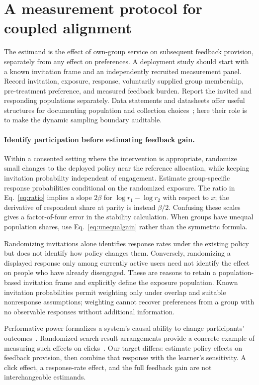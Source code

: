 \documentclass{article}
\begin{document}
\section{A measurement protocol for coupled alignment}\label{sec:measurement}
The estimand is the effect of own-group service on subsequent feedback provision, separately from any effect on preferences. A deployment study should start with a known invitation frame and an independently recruited measurement panel. Record invitation, exposure, response, voluntarily supplied group membership, pre-treatment preference, and measured feedback burden. Report the invited and responding populations separately. Data statements and datasheets offer useful structures for documenting population and collection choices~\citep{bender2018,gebru2021}; here their role is to make the dynamic sampling boundary auditable.

\paragraph{Identify participation before estimating feedback gain.}
Within a consented setting where the intervention is appropriate, randomize small changes to the deployed policy near the reference allocation, while keeping invitation probability independent of engagement. Estimate group-specific response probabilities conditional on the randomized exposure. The ratio in Eq.~\eqref{eq:ratio} implies a slope $2\beta$ for $\log r_1-\log r_2$ with respect to $x$; the derivative of respondent share at parity is instead $\beta/2$. Confusing these scales gives a factor-of-four error in the stability calculation. When groups have unequal population shares, use Eq.~\eqref{eq:unequalgain} rather than the symmetric formula.

Randomizing invitations alone identifies response rates under the existing policy but does not identify how policy changes them. Conversely, randomizing a displayed response only among currently active users need not identify the effect on people who have already disengaged. These are reasons to retain a population-based invitation frame and explicitly define the exposure population. Known invitation probabilities permit weighting only under overlap and suitable nonresponse assumptions; weighting cannot recover preferences from a group with no observable responses without additional information.

Performative power formalizes a system's causal ability to change participants' outcomes~\citep{hardt2022}. Randomized search-result arrangements provide a concrete example of measuring such effects on clicks~\citep{search2024}. Our target differs: estimate policy effects on feedback provision, then combine that response with the learner's sensitivity. A click effect, a response-rate effect, and the full feedback gain are not interchangeable estimands.
\end{document}
